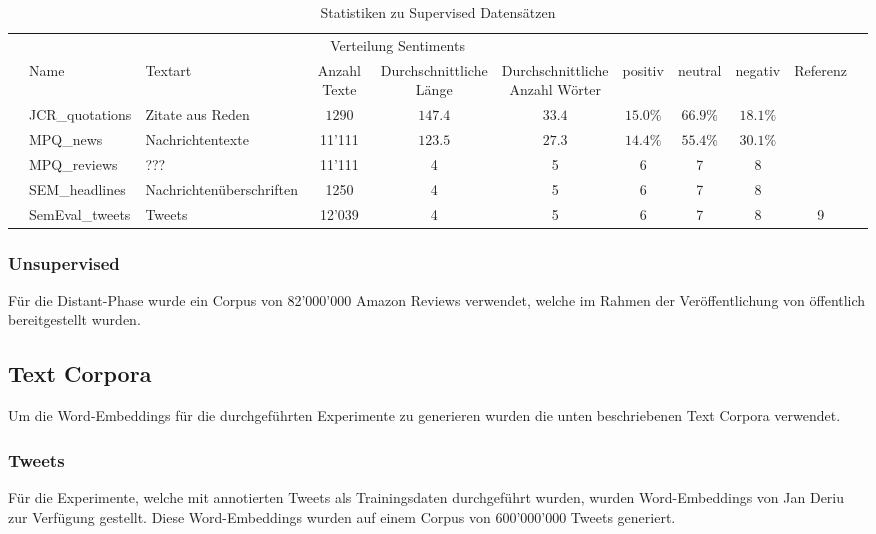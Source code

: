 \begin{table*}\centering
	\begin{adjustbox}{max width=\textwidth}
		\begin{tabular}{@{}lllcccccccl@{}}
			\toprule
			\multicolumn{9}{c}{Verteilung Sentiments}\\
			\cmidrule(r){7-9}
			& Name & Textart & Anzahl Texte & \specialcell{Durchschnittliche\\Länge} & \specialcell{Durchschnittliche\\Anzahl Wörter} & positiv & neutral & negativ & Referenz &\\ \midrule
			& JCR{\_}quotations & Zitate aus Reden & $1290$ & $147.4$ & $33.4$ & $15.0\%$ & $66.9\%$ & $18.1\%$ & \cite{CielEtAlEssem}\\
			& MPQ{\_}news & Nachrichtentexte & 11'111 & $123.5$ & $27.3$ & $14.4\%$ & $55.4\%$ & $30.1\%$ & \cite{CielEtAlEssem}\\
			& MPQ{\_}reviews & ??? & 11'111 & 4 & 5 & 6 & 7 & 8 & \cite{CielEtAlEssem}\\
			& SEM{\_}headlines & Nachrichtenüberschriften & 1250 & 4 & 5 & 6 & 7 & 8 & \cite{CielEtAlEssem}\\
			& SemEval{\_}tweets & Tweets & 12'039 & 4 & 5 & 6 & 7 & 8 & 9\\
			\bottomrule
		\end{tabular}
	\end{adjustbox}
	\caption{Statistiken zu Supervised Datensätzen}
\end{table*}

\subsubsection{Unsupervised}
Für die Distant-Phase wurde ein Corpus von 82'000'000 Amazon Reviews verwendet, welche im Rahmen der Veröffentlichung von \cite{ZhangEtAlAmazon} öffentlich bereitgestellt wurden.

\subsection{Text Corpora}
Um die Word-Embeddings für die durchgeführten Experimente zu generieren wurden die unten beschriebenen Text Corpora verwendet.

\subsubsection{Tweets}
Für die Experimente, welche mit annotierten Tweets als Trainingsdaten durchgeführt wurden, wurden Word-Embeddings von Jan Deriu zur Verfügung gestellt. Diese Word-Embeddings wurden auf einem Corpus von 600'000'000 Tweets generiert.

